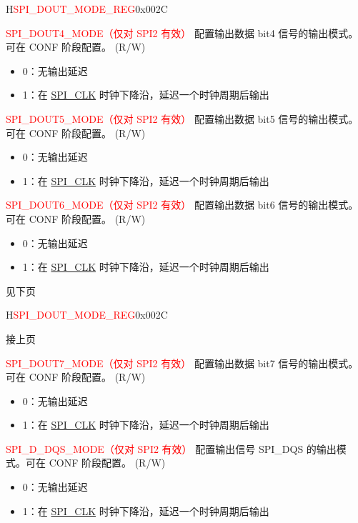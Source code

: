 \begin{register}{H}{\textcolor{red}{SPI\_DOUT\_MODE\_REG}}{0x{}002C}
\begin{regdesc}
\begin{reglist}
\label{fielddesc:SPIDOUT4MODE}\item [\textcolor{red}{SPI\_DOUT4\_MODE（仅对 SPI2 有效）}] 配置输出数据 bit4 信号的输出模式。可在 CONF 阶段配置。 (R/W)
\begin{itemize}
    \item 0：无输出延迟
    \item 1：在 \hyperref[clk:SPICLK]{SPI\_CLK} 时钟下降沿，延迟一个时钟周期后输出
\end{itemize}
\label{fielddesc:SPIDOUT5MODE}\item [\textcolor{red}{SPI\_DOUT5\_MODE（仅对 SPI2 有效）}] 配置输出数据 bit5 信号的输出模式。可在 CONF 阶段配置。 (R/W)
\begin{itemize}
    \item 0：无输出延迟
    \item 1：在 \hyperref[clk:SPICLK]{SPI\_CLK} 时钟下降沿，延迟一个时钟周期后输出
\end{itemize}
\label{fielddesc:SPIDOUT6MODE}\item [\textcolor{red}{SPI\_DOUT6\_MODE（仅对 SPI2 有效）}] 配置输出数据 bit6 信号的输出模式。可在 CONF 阶段配置。 (R/W)
\begin{itemize}
    \item 0：无输出延迟
    \item 1：在 \hyperref[clk:SPICLK]{SPI\_CLK} 时钟下降沿，延迟一个时钟周期后输出
\end{itemize}

\item [见下页]
\end{reglist}\end{regdesc}
\end{register}

\addtocounter{Regfloat}{-1}
\begin{register}{H}{\textcolor{red}{SPI\_DOUT\_MODE\_REG}}{0x{}002C}
\begin{regdesc}\begin{reglist}
\item [接上页]

\label{fielddesc:SPIDOUT7MODE}\item [\textcolor{red}{SPI\_DOUT7\_MODE（仅对 SPI2 有效）}] 配置输出数据 bit7 信号的输出模式。可在 CONF 阶段配置。 (R/W)
\begin{itemize}
    \item 0：无输出延迟
    \item 1：在 \hyperref[clk:SPICLK]{SPI\_CLK} 时钟下降沿，延迟一个时钟周期后输出
\end{itemize}
\label{fielddesc:SPIDDQSMODE}\item [\textcolor{red}{SPI\_D\_DQS\_MODE（仅对 SPI2 有效）}] 配置输出信号 SPI\_DQS 的输出模式。可在 CONF 阶段配置。 (R/W)
\begin{itemize}
    \item 0：无输出延迟
    \item 1：在 \hyperref[clk:SPICLK]{SPI\_CLK} 时钟下降沿，延迟一个时钟周期后输出
\end{itemize}
\end{reglist}\end{regdesc}
\end{register}


